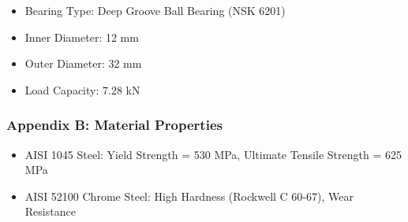 \documentclass[../../main]{subfiles}
\begin{document}
\begin{itemize}
\item
  Bearing Type: Deep Groove Ball Bearing (NSK 6201)
\item
  Inner Diameter: 12 mm
\item
  Outer Diameter: 32 mm
\item
  Load Capacity: 7.28 kN
\end{itemize}

\subsubsection{\texorpdfstring{\textbf{Appendix B: Material
Properties}}{Appendix B: Material Properties}}\label{appendix-b-material-properties}

\begin{itemize}
\item
  AISI 1045 Steel: Yield Strength = 530 MPa, Ultimate Tensile Strength =
  625 MPa
\item
  AISI 52100 Chrome Steel: High Hardness (Rockwell C 60-67), Wear
  Resistance
\end{itemize}

\subsection{}\label{section-7}

\subsection{}\label{section-8}

\subsection{}\label{section-9}

\subsection{}\label{section-10}

\subsection{}\label{section-11}

\subsection{}\label{section-12}
\end{document}
